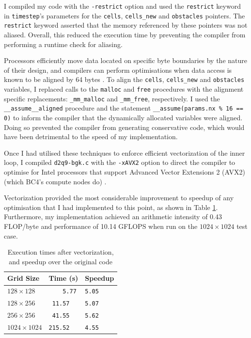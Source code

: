 \documentclass[twocolumn, a4paper]{article}
\begin{document}
I compiled my code with the \texttt{-restrict} option and used the \texttt{restrict} keyword in \texttt{timestep}'s parameters for the \texttt{cells}, \texttt{cells\_new} and \texttt{obstacles} pointers. The \texttt{restrict} keyword asserted that the memory referenced by these pointers was not aliased.
Overall, this reduced the execution time by preventing the compiler from performing a runtime check for aliasing.

Processors efficiently move data located on specific byte boundaries by the nature of their design, and compilers can perform optimisations when data access is known to be aligned by 64 bytes \cite{alignment}.
To align the \texttt{cells}, \texttt{cells\_new} and \texttt{obstacles} variables, I replaced calls to the \texttt{malloc} and \texttt{free} procedures with the alignment specific replacements: \texttt{\_mm\_malloc} and \texttt{\_mm\_free}, respectively.
I used the \texttt{\_\_assume\_\_aligned} procedure and  the statement \texttt{\_\_assume(params.nx \% 16 == 0)} to inform the compiler that the dynamically allocated variables were aligned.
Doing so prevented the compiler from generating conservative code, which would have been detrimental to the speed of my implementation.

Once I had utilised these techniques to enforce efficient vectorization of the inner loop, I compiled \texttt{d2q9-bgk.c} with the \texttt{-xAVX2} option to direct the compiler to optimise for Intel processors that support Advanced Vector Extensions 2 (AVX2) (which BC4's compute nodes do) \cite{lenovo}.

Vectorization provided the most considerable improvement to speedup of any optimisation that I had implemented to this point, as shown in Table \ref{tab:vectorized}.
Furthermore, my implementation achieved an arithmetic intensity of 0.43 FLOP/byte and performance of 10.14 GFLOPS when run on the $1024\times1024$ test case.

\begin{table}[htbp]
  \begin{center}
  \caption{Execution times after vectorization, and speedup over the original code}\label{tab:vectorized}
  \begin{tabular}{l | l l} 
      \hline\hline
      Grid Size&Time (s)&Speedup\\
      \hline
      $128 \times 128$&\texttt{  \,\,\,5.77}&\texttt{5.05}\\
      $128 \times 256$&\texttt{ 11.57}&\texttt{5.07}\\
      $256 \times 256$&\texttt{ 41.55}&\texttt{5.62}\\
      $1024 \times 1024$&\texttt{215.52}&\texttt{4.55}\\
      \hline
    \end{tabular}
  \end{center}
\end{table}
\end{document}

